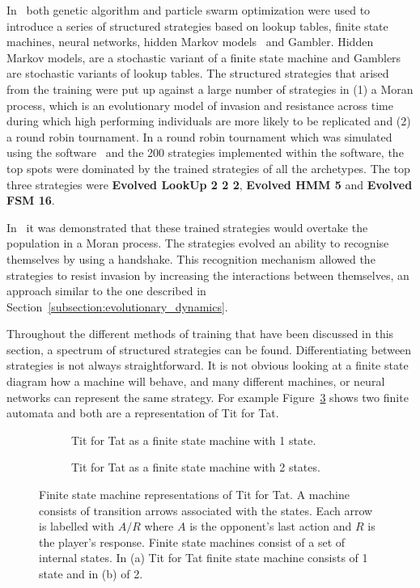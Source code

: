 \documentclass{article}
\theoremstyle{definition}
\begin{document}
In~\cite{Knight2017, KnightHGC17} both genetic algorithm and particle swarm
optimization were used to introduce a series of structured strategies based on
lookup tables, finite state machines, neural networks, hidden Markov
models~\cite{eddy1996} and Gambler. Hidden Markov models, are a stochastic
variant of a finite state machine and Gamblers are stochastic variants of lookup
tables. The structured strategies that arised from the training were put up
against a large number of strategies in (1) a Moran process, which is an
evolutionary model of invasion and resistance across time during which high
performing individuals are more likely to be replicated and (2)
a round robin tournament. In a round robin tournament which was simulated using the
software~\cite{axelrodproject} and the 200 strategies implemented within the
software, the top spots were dominated by the trained strategies of all the
archetypes. The top three strategies were \textbf{Evolved
LookUp 2 2 2}, \textbf{Evolved HMM 5} and \textbf{Evolved FSM 16}.

In~\cite{KnightHGC17} it was demonstrated that these trained strategies
would overtake the population in a Moran process. The strategies evolved an ability
to recognise themselves by using a handshake. This recognition mechanism allowed the strategies
to resist invasion by increasing the interactions between themselves, an approach
similar to the one described in Section~\ref{subsection:evolutionary_dynamics}.

Throughout the different methods of training that have been discussed in this
section, a spectrum of structured strategies can be found. Differentiating
between strategies is not always straightforward. It is not obvious looking at a
finite state diagram how a machine will behave, and many different machines, or
neural networks can represent the same strategy. For example
Figure~\ref{fig:machine_tft} shows two finite automata and both are a
representation of Tit for Tat.

\begin{figure}[!hbtp]
    \begin{subfigure}{.45\textwidth}\centering
        
        \caption{Tit for Tat as a finite state machine with 1 state.}\label{fig:representation_a}
    \end{subfigure}
    \begin{subfigure}{.45\textwidth}\centering
        
        \caption{Tit for Tat as a finite state machine with 2 states.}\label{fig:representation_b}
     \end{subfigure}
     \caption{Finite state machine representations of Tit for Tat. A machine
     consists of transition arrows associated with the states. Each arrow is
     labelled with \(A/R\) where \(A\) is the opponent's last action and \(R\)
     is the player's response. Finite state machines consist of a set of
     internal states. In (a) Tit for Tat finite state
     machine consists of 1 state and in (b) of 2.}\label{fig:machine_tft}
\end{figure}
\end{document}
